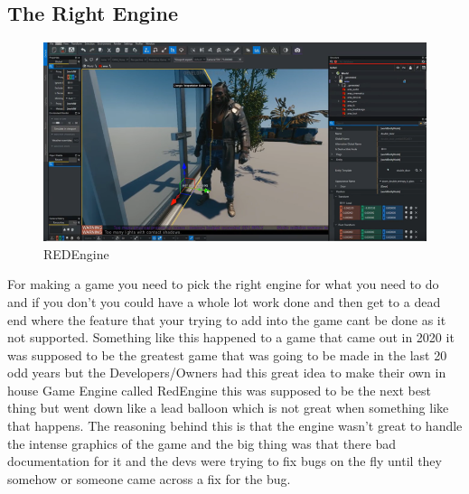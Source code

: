 \subsection{The Right Engine}
\begin{figure}[H]
    \centering
    \includegraphics[scale=.5]{img/REDengine.png}
    \caption{REDEngine}
    \label{REDEngine}
\end{figure}
For making a game you need to pick the right engine for what you need to do and if you don't you could have a whole lot work done and then get to a dead end where the feature that your trying to add into the game cant be done as it not supported.
\newline
\newline
Something like this happened to a game that came out in 2020 it was supposed to be the greatest game that was going to be made in the last 20 odd years but the Developers/Owners had this great idea to make their own in house Game Engine called RedEngine this was supposed to be the next best thing but went down like a lead balloon which is not great when something like that happens. The reasoning behind this is that the engine wasn't great to handle the intense graphics of the game and the big thing was that there bad documentation for it and the devs were trying to fix bugs on the fly until they somehow or someone came across a fix for the bug.
